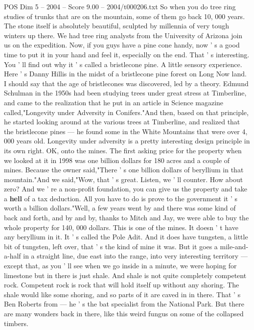 \begin{textsample}{POS Dim 5 – 2004 – Score 9.00 – 2004/t000206.txt}
So when you do tree ring studies of trunks that are on the mountain, some of them go back 10, 000 years.
The stone itself is absolutely beautiful, sculpted by millennia of very tough winters up there.
We had tree ring analysts from the University of Arizona join us on the expedition.
Now, if you guys have a pine cone handy, now ' s a good time to put it in your hand and feel it, especially on the end.
That ' s interesting.
You ' ll find out why it ' s called a bristlecone pine.
A little sensory experience.
Here ' s Danny Hillis in the midst of a bristlecone pine forest on Long Now land.
I should say that the age of bristlecones was discovered, led by a theory.
Edmund Schulman in the 1950s had been studying trees under great stress at Timberline, and came to the realization that he put in an article in Science magazine called,"Longevity under Adversity in Conifers."And then, based on that principle, he started looking around at the various trees at Timberline, and realized that the bristlecone pines — he found some in the White Mountains that were over 4, 000 years old.
Longevity under adversity is a pretty interesting design principle in its own right.
OK, onto the mines.
The first asking price for the property when we looked at it in 1998 was one billion dollars for 180 acres and a couple of mines.
Because the owner said,"There ' s one billion dollars of beryllium in that mountain."And we said,"Wow, that ' s great.
Listen, we ' ll counter.
How about zero?
And we ' re a non-profit foundation, you can give us the property and take a \textbf{hell} of a tax deduction.
All you have to do is prove to the government it ' s worth a billion dollars."Well, a few years went by and there was some kind of back and forth, and by and by, thanks to Mitch and Jay, we were able to buy the whole property for 140, 000 dollars.
This is one of the mines.
It doesn ' t have any beryllium in it.
It ' s called the Pole Adit.
And it does have tungsten, a little bit of tungsten, left over, that ' s the kind of mine it was.
But it goes a mile-and-a-half in a straight line, due east into the range, into very interesting territory — except that, as you ' ll see when we go inside in a minute, we were hoping for limestone but in there is just shale.
And shale is not quite completely competent rock.
Competent rock is rock that will hold itself up without any shoring.
The shale would like some shoring, and so parts of it are caved in in there.
That ' s Ben Roberts from — he ' s the bat specialist from the National Park.
But there are many wonders back in there, like this weird fungus on some of the collapsed timbers.

\end{textsample}
